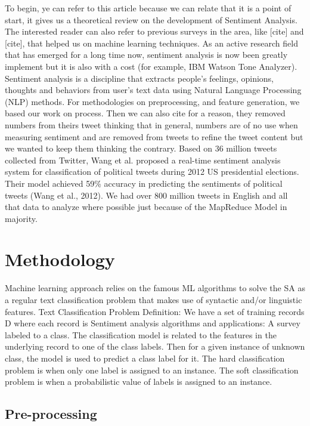 \documentclass{acmtog} %
\begin{document}
To begin, ye can refer to this article \cite{Palpanas11} because we can relate that it is a point of start, it gives us a theoretical review on the development of Sentiment Analysis.
The interested reader can also refer to previous surveys in the area, like [cite] and [cite], that helped us on machine learning techniques. As an active research field that has emerged for a long time now, sentiment analysis is now been greatly implement but it is also with a cost (for example, IBM Watson Tone Analyzer). Sentiment analysis is a discipline that extracts people’s feelings, opinions, thoughts and behaviors from user’s text data using Natural Language Processing (NLP) methods. 
For methodologies on preprocessing, and feature generation, we based our work on \cite{Meisheri17} process. Then we can also cite \cite{Jianqiang17} for a reason, they removed numbers from theirs tweet thinking that in general, numbers are of no use when measuring sentiment and are removed from tweets to refine the tweet content but we wanted to keep them thinking the contrary.
Based on 36 million tweets collected from Twitter, Wang et al. proposed a real-time sentiment analysis system for classification of political tweets during 2012 US presidential elections. Their model achieved 59\% accuracy in predicting the sentiments of political tweets (Wang et al., 2012).
We had over 800 million tweets in English and all that data to analyze where possible just because of the MapReduce Model \cite{Baltas17} in majority.


\section{Methodology}
\label{sec:methodology}

Machine learning approach relies on the famous ML algorithms to solve the SA as a regular text classification problem that makes use of syntactic and/or linguistic features. Text Classification Problem Definition: We have a set of training records D  where each record is Sentiment analysis algorithms and applications: A survey labeled to a class. The classification model is related to the features in the underlying record to one of the class labels. Then for a given instance of unknown class, the model is used to predict a class label for it. The hard classification problem is when only one label is assigned to an instance. The soft classification problem is when a probabilistic value of labels is assigned to an instance.

\subsection{Pre-processing}
\label{subsub:preprocessing}
\end{document}
